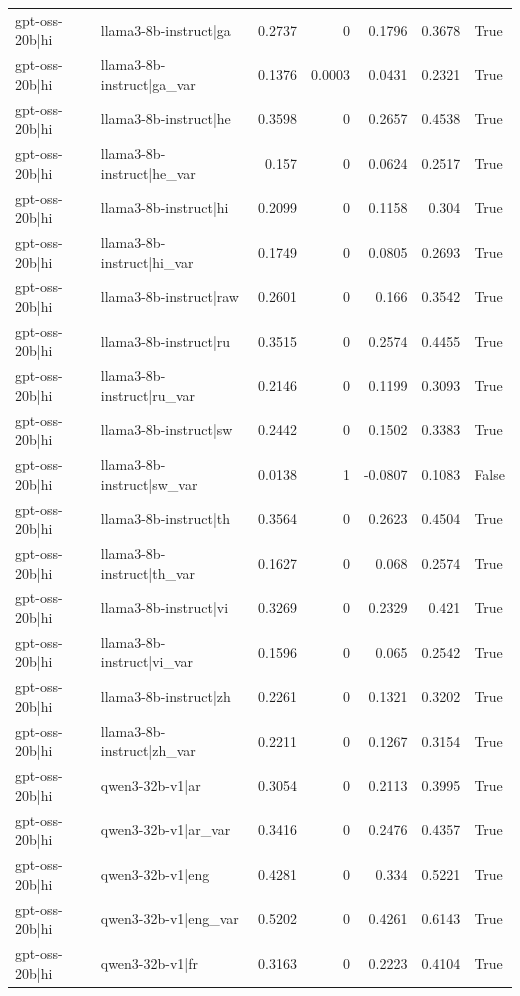 \begin{table}
\begin{tabular}{l l r r r r l}
gpt-oss-20b|hi & llama3-8b-instruct|ga & 0.2737 & 0 & 0.1796 & 0.3678 & True \\
gpt-oss-20b|hi & llama3-8b-instruct|ga_var & 0.1376 & 0.0003 & 0.0431 & 0.2321 & True \\
gpt-oss-20b|hi & llama3-8b-instruct|he & 0.3598 & 0 & 0.2657 & 0.4538 & True \\
gpt-oss-20b|hi & llama3-8b-instruct|he_var & 0.157 & 0 & 0.0624 & 0.2517 & True \\
gpt-oss-20b|hi & llama3-8b-instruct|hi & 0.2099 & 0 & 0.1158 & 0.304 & True \\
gpt-oss-20b|hi & llama3-8b-instruct|hi_var & 0.1749 & 0 & 0.0805 & 0.2693 & True \\
gpt-oss-20b|hi & llama3-8b-instruct|raw & 0.2601 & 0 & 0.166 & 0.3542 & True \\
gpt-oss-20b|hi & llama3-8b-instruct|ru & 0.3515 & 0 & 0.2574 & 0.4455 & True \\
gpt-oss-20b|hi & llama3-8b-instruct|ru_var & 0.2146 & 0 & 0.1199 & 0.3093 & True \\
gpt-oss-20b|hi & llama3-8b-instruct|sw & 0.2442 & 0 & 0.1502 & 0.3383 & True \\
gpt-oss-20b|hi & llama3-8b-instruct|sw_var & 0.0138 & 1 & -0.0807 & 0.1083 & False \\
gpt-oss-20b|hi & llama3-8b-instruct|th & 0.3564 & 0 & 0.2623 & 0.4504 & True \\
gpt-oss-20b|hi & llama3-8b-instruct|th_var & 0.1627 & 0 & 0.068 & 0.2574 & True \\
gpt-oss-20b|hi & llama3-8b-instruct|vi & 0.3269 & 0 & 0.2329 & 0.421 & True \\
gpt-oss-20b|hi & llama3-8b-instruct|vi_var & 0.1596 & 0 & 0.065 & 0.2542 & True \\
gpt-oss-20b|hi & llama3-8b-instruct|zh & 0.2261 & 0 & 0.1321 & 0.3202 & True \\
gpt-oss-20b|hi & llama3-8b-instruct|zh_var & 0.2211 & 0 & 0.1267 & 0.3154 & True \\
gpt-oss-20b|hi & qwen3-32b-v1|ar & 0.3054 & 0 & 0.2113 & 0.3995 & True \\
gpt-oss-20b|hi & qwen3-32b-v1|ar_var & 0.3416 & 0 & 0.2476 & 0.4357 & True \\
gpt-oss-20b|hi & qwen3-32b-v1|eng & 0.4281 & 0 & 0.334 & 0.5221 & True \\
gpt-oss-20b|hi & qwen3-32b-v1|eng_var & 0.5202 & 0 & 0.4261 & 0.6143 & True \\
gpt-oss-20b|hi & qwen3-32b-v1|fr & 0.3163 & 0 & 0.2223 & 0.4104 & True \\

\end{tabular}
\end{table}
